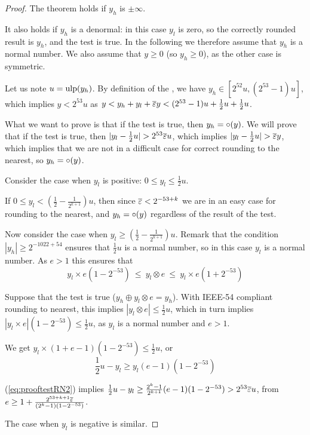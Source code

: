 \begin{proof}
  The theorem holds if $y_h$ is $\pm \infty$.
  
  It also holds if $y_h$ is a denormal: in this case $y_l$ is zero, so
  the correctly rounded result is $y_h$, and the test is true. In the
  following we therefore assume that $y_h$ is a normal number. We also
  assume that $y\ge0$ (so $y_h\ge0$), as the other case is symmetric.
  
  Let us note $u=\mbox{ulp}(y_h)$. By definition of the \ulp, we have $y_h
  \in [2^{52}u, (2^{53}-1)u]$, which implies $y<2^{53}u$ as $y < y_h + y_l +{\overline{\varepsilon}} y
  < (2^{53}-1)u +\frac{1}{2}u +\frac{1}{2}u$.

  What we want to prove is that if the test is true, then $y_h =
  \circ(y)$. We will prove that  if the test is true, then $|y_l-\frac{1}{2}u| > 2^{53}{\overline{\varepsilon}}
  u$, which implies $|y_l-\frac{1}{2}u| > {\overline{\varepsilon}} y$, which implies
  that we are not in a difficult case for correct rounding to the
  nearest, so $y_h = \circ(y)$.

  Consider the case when $y_l$ is positive:  $0\le y_l \le \frac{1}{2}u$.

  If $0 \le y_l < (\frac{1}{2} - \frac{1}{2^{k+1}})u$, then since
    ${\overline{\varepsilon}}<2^{-53+k}$ we are in an easy case for rounding to the
    nearest, and $y_h = \circ(y)$ regardless of the result of the test.

    Now consider the case when $y_l \ge (\frac{1}{2} - \frac{1}{2^{k+1}})u$.
    Remark that the condition $|y_h|\ge 2^{-1022+54}$ ensures that
    $\frac{1}{2}u$ is a normal number, so in this case
    $y_l$ is a normal number. As $e>1$ this ensures that
    $$y_l\times e(1-2^{-53})\ \le\ y_l \otimes e\ \le\ y_l\times e(1+2^{-53})$$


  Suppose that the test is true ($y_h \oplus y_l \otimes e = y_h$). 
  With IEEE-54 compliant rounding to
  nearest, this implies $|y_l \otimes e|
  \le \frac{1}{2}u$, which in turn implies $|y_l \times e|
  (1-2^{-53}) \le \frac{1}{2}u$, as $y_l$ is a normal number and $e>1$. 
  
  We get $y_l \times (1+e-1)(1-2^{-53}) \le \frac{1}{2}u$, or
  \begin{equation}
  \frac{1}{2}u - y_l \ge y_l (e-1)(1-2^{-53})\label{eq:prooftestRN2}
  \end{equation}  

(\ref{eq:prooftestRN2}) implies
    $\frac{1}{2}u - y_l \ge \frac{2^{k}-1}{2^{k+1}} (e-1)(1-2^{-53}) >
    2^{53}{\overline{\varepsilon}} u$, from $e\ge 1+
    \frac{2^{53+k+1}{\overline{\varepsilon}}}{(2^{k}-1)(1-2^{-53})}$.

  The case when $y_l$ is negative is similar.
\end{proof}



